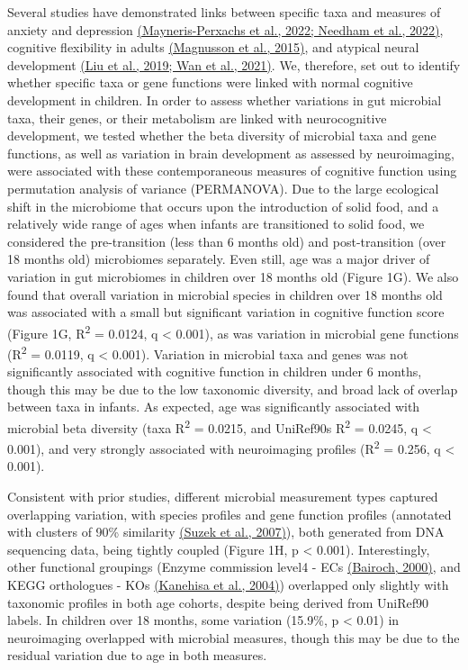 Several studies have demonstrated links between specific taxa and
measures of anxiety and depression
\href{https://www.zotero.org/google-docs/?X5rfKj}{(Mayneris-Perxachs et
al., 2022; Needham et al., 2022)}, cognitive flexibility in adults
\href{https://www.zotero.org/google-docs/?RGIf8m}{(Magnusson et al.,
2015)}, and atypical neural development
\href{https://www.zotero.org/google-docs/?hwPZKh}{(Liu et al., 2019; Wan
et al., 2021)}. We, therefore, set out to identify whether specific taxa
or gene functions were linked with normal cognitive development in
children. In order to assess whether variations in gut microbial taxa,
their genes, or their metabolism are linked with neurocognitive
development, we tested whether the beta diversity of microbial taxa and
gene functions, as well as variation in brain development as assessed by
neuroimaging, were associated with these contemporaneous measures of
cognitive function using permutation analysis of variance (PERMANOVA).
Due to the large ecological shift in the microbiome that occurs upon the
introduction of solid food, and a relatively wide range of ages when
infants are transitioned to solid food, we considered the pre-transition
(less than 6 months old) and post-transition (over 18 months old)
microbiomes separately. Even still, age was a major driver of variation
in gut microbiomes in children over 18 months old (Figure 1G). We also
found that overall variation in microbial species in children over 18
months old was associated with a small but significant variation in
cognitive function score (Figure 1G, R\textsuperscript{2} = 0.0124, q
\textless{} 0.001), as was variation in microbial gene functions
(R\textsuperscript{2} = 0.0119, q \textless{} 0.001). Variation in
microbial taxa and genes was not significantly associated with cognitive
function in children under 6 months, though this may be due to the low
taxonomic diversity, and broad lack of overlap between taxa in infants.
As expected, age was significantly associated with microbial beta
diversity (taxa R\textsuperscript{2} = 0.0215, and UniRef90s
R\textsuperscript{2} = 0.0245, q \textless{} 0.001), and very strongly
associated with neuroimaging profiles (R\textsuperscript{2} = 0.256, q
\textless{} 0.001).

Consistent with prior studies, different microbial measurement types
captured overlapping variation, with species profiles and gene function
profiles (annotated with clusters of 90\% similarity
\href{https://www.zotero.org/google-docs/?b9rEJS}{(Suzek et al.,
2007)}), both generated from DNA sequencing data, being tightly coupled
(Figure 1H, p \textless{} 0.001). Interestingly, other functional
groupings (Enzyme commission level4 - ECs
\href{https://www.zotero.org/google-docs/?fs8LO7}{(Bairoch, 2000)}, and
KEGG orthologues - KOs
\href{https://www.zotero.org/google-docs/?Xx5duE}{(Kanehisa et al.,
2004)}) overlapped only slightly with taxonomic profiles in both age
cohorts, despite being derived from UniRef90 labels. In children over 18
months, some variation (15.9\%, p \textless{} 0.01) in neuroimaging
overlapped with microbial measures, though this may be due to the
residual variation due to age in both measures.

